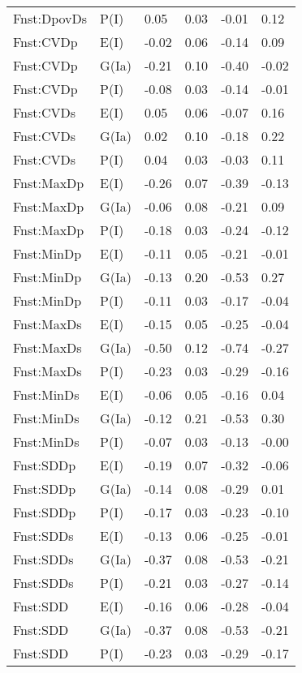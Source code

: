 \begin{center}
\begin{longtable}{|p{1.1in}|p{0.7in}|p{0.7in}|p{0.6in}|p{0.6in}|p{0.6in}|}
  Fnst:DpovDs & P(I) & 0.05 & 0.03 & -0.01 & 0.12 \\ 
  Fnst:CVDp & E(I) & -0.02 & 0.06 & -0.14 & 0.09 \\ 
  Fnst:CVDp & G(Ia) & -0.21 & 0.10 & -0.40 & -0.02 \\ 
  Fnst:CVDp & P(I) & -0.08 & 0.03 & -0.14 & -0.01 \\ 
  Fnst:CVDs & E(I) & 0.05 & 0.06 & -0.07 & 0.16 \\ 
  Fnst:CVDs & G(Ia) & 0.02 & 0.10 & -0.18 & 0.22 \\ 
  Fnst:CVDs & P(I) & 0.04 & 0.03 & -0.03 & 0.11 \\ 
  Fnst:MaxDp & E(I) & -0.26 & 0.07 & -0.39 & -0.13 \\ 
  Fnst:MaxDp & G(Ia) & -0.06 & 0.08 & -0.21 & 0.09 \\ 
  Fnst:MaxDp & P(I) & -0.18 & 0.03 & -0.24 & -0.12 \\ 
  Fnst:MinDp & E(I) & -0.11 & 0.05 & -0.21 & -0.01 \\ 
  Fnst:MinDp & G(Ia) & -0.13 & 0.20 & -0.53 & 0.27 \\ 
  Fnst:MinDp & P(I) & -0.11 & 0.03 & -0.17 & -0.04 \\ 
  Fnst:MaxDs & E(I) & -0.15 & 0.05 & -0.25 & -0.04 \\ 
  Fnst:MaxDs & G(Ia) & -0.50 & 0.12 & -0.74 & -0.27 \\ 
  Fnst:MaxDs & P(I) & -0.23 & 0.03 & -0.29 & -0.16 \\ 
  Fnst:MinDs & E(I) & -0.06 & 0.05 & -0.16 & 0.04 \\ 
  Fnst:MinDs & G(Ia) & -0.12 & 0.21 & -0.53 & 0.30 \\ 
  Fnst:MinDs & P(I) & -0.07 & 0.03 & -0.13 & -0.00 \\ 
  Fnst:SDDp & E(I) & -0.19 & 0.07 & -0.32 & -0.06 \\ 
  Fnst:SDDp & G(Ia) & -0.14 & 0.08 & -0.29 & 0.01 \\ 
  Fnst:SDDp & P(I) & -0.17 & 0.03 & -0.23 & -0.10 \\ 
  Fnst:SDDs & E(I) & -0.13 & 0.06 & -0.25 & -0.01 \\ 
  Fnst:SDDs & G(Ia) & -0.37 & 0.08 & -0.53 & -0.21 \\ 
  Fnst:SDDs & P(I) & -0.21 & 0.03 & -0.27 & -0.14 \\ 
  Fnst:SDD & E(I) & -0.16 & 0.06 & -0.28 & -0.04 \\ 
  Fnst:SDD & G(Ia) & -0.37 & 0.08 & -0.53 & -0.21 \\ 
  Fnst:SDD & P(I) & -0.23 & 0.03 & -0.29 & -0.17 \\ 

\end{longtable}
\end{center}
